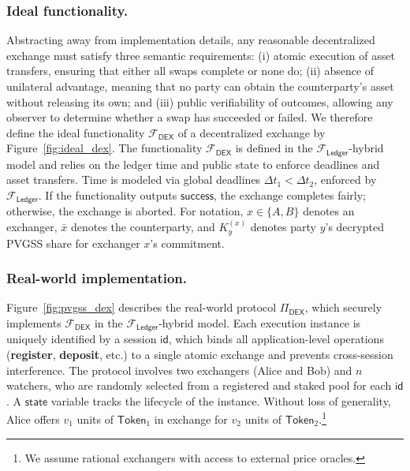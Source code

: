 \documentclass[runningheads]{llncs}
\newcommand{\dex}{\mathcal{F}_{\mathsf{DEX}}}
\newcommand{\swapid}{\mathsf{id}}
\begin{document}
\subsubsection{Ideal functionality.}
Abstracting away from implementation details, any reasonable decentralized exchange must satisfy three semantic requirements: (i) atomic execution of asset transfers, ensuring that either all swaps complete or none do; (ii) absence of unilateral advantage, meaning that no party can obtain the counterparty's asset without releasing its own; and (iii) public verifiability of outcomes, allowing any observer to determine whether a swap has succeeded or failed.
We therefore define the ideal functionality $\dex$ of a decentralized exchange by Figure~\ref{fig:ideal_dex}.
The functionality $\mathcal{F}_{\mathsf{DEX}}$ is defined in the $\mathcal{F}_{\mathsf{Ledger}}$-hybrid model and relies on the ledger time and public state to enforce deadlines and asset transfers.
Time is modeled via global deadlines $\Delta t_1 < \Delta t_2$, enforced by $\mathcal{F}_{\mathsf{Ledger}}$.
If the functionality outputs \(\mathsf{success}\), the exchange completes fairly; otherwise, the exchange is aborted.
For notation, \(x\in\{A,B\}\) denotes an exchanger, \(\bar{x}\) denotes the counterparty, and \(K_y^{(x)}\) denotes party \(y\)'s decrypted PVGSS share for exchanger \(x\)'s commitment.




\subsubsection{Real-world implementation.}
Figure~\ref{fig:pvgss_dex} describes the real-world protocol $\Pi_{\mathsf{DEX}}$, which securely implements $\mathcal{F}_{\mathsf{DEX}}$ in the $\mathcal{F}_{\mathsf{Ledger}}$-hybrid model.
Each execution instance is uniquely identified by a session $\swapid$, which binds all application-level operations (\textbf{register}, \textbf{deposit}, etc.) to a single atomic exchange and prevents cross-session interference. 
The protocol involves two exchangers (Alice and Bob) and $n$ watchers, who are randomly selected from a registered and staked pool for each $\swapid$.
A $\mathsf{state}$ variable tracks the lifecycle of the instance.
Without loss of generality, Alice offers $v_1$ units of $\mathsf{Token}_1$ in exchange for $v_2$ units of $\mathsf{Token}_2$.\footnote{We assume rational exchangers with access to external price oracles.}
\end{document}
